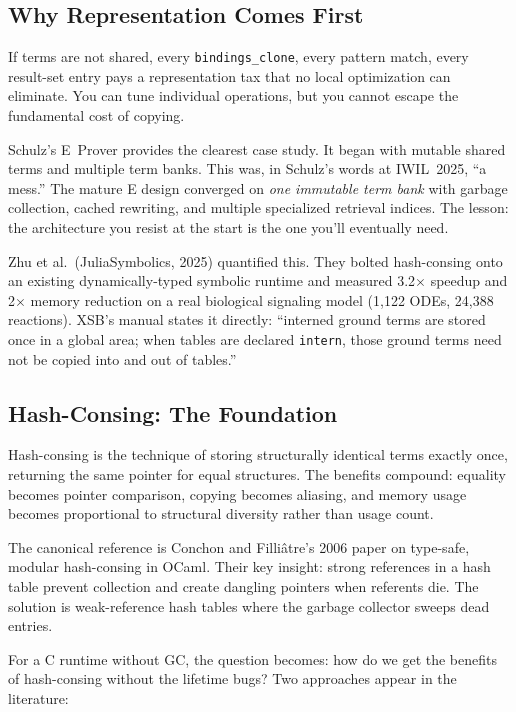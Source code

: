\documentclass[11pt]{article}
\newcommand{\code}[1]{\texttt{#1}}
\newcommand{\XSB}{\textup{XSB}}
\begin{document}
\subsection{Why Representation Comes First}

If terms are not shared, every \code{bindings\_clone}, every pattern
match, every result-set entry pays a representation tax that no local
optimization can eliminate.  You can tune individual operations, but
you cannot escape the fundamental cost of copying.

Schulz's E~Prover provides the clearest case study.  It began with
mutable shared terms and multiple term banks.  This was, in Schulz's
words at IWIL~2025, ``a mess.''  The mature E design converged on
\emph{one immutable term bank} with garbage collection, cached rewriting,
and multiple specialized retrieval indices.  The lesson: the architecture
you resist at the start is the one you'll eventually need.

Zhu et al.~(JuliaSymbolics, 2025) quantified this.  They bolted hash-consing
onto an existing dynamically-typed symbolic runtime and measured 3.2$\times$
speedup and 2$\times$ memory reduction on a real biological signaling model
(1,122 ODEs, 24,388 reactions).  \XSB{}'s manual states it directly:
``interned ground terms are stored once in a global area; when tables are
declared \texttt{intern}, those ground terms need not be copied into and
out of tables.''

\subsection{Hash-Consing: The Foundation}

Hash-consing is the technique of storing structurally identical terms
exactly once, returning the same pointer for equal structures.  The
benefits compound: equality becomes pointer comparison, copying becomes
aliasing, and memory usage becomes proportional to structural diversity
rather than usage count.

The canonical reference is Conchon and Filliâtre's 2006 paper on
type-safe, modular hash-consing in OCaml.  Their key insight: strong
references in a hash table prevent collection and create dangling pointers
when referents die.  The solution is weak-reference hash tables where
the garbage collector sweeps dead entries.

For a C runtime without GC, the question becomes: how do we get the
benefits of hash-consing without the lifetime bugs?  Two approaches
appear in the literature:
\end{document}
